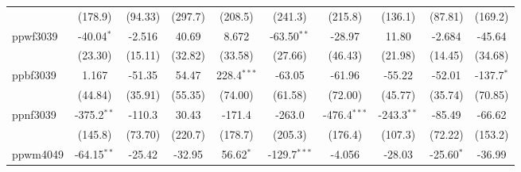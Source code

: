 \begin{table}[htbp]
\begin{tabular}{lccccccccc}
                                     & (178.9)                      & (94.33)                       & (297.7)                     & (208.5)                   & (241.3)                       & (215.8)                      & (136.1)                       & (87.81)                      & (169.2)\\   
      ppwf3039                       & -40.04$^{*}$                 & -2.516                        & 40.69                       & 8.672                     & -63.50$^{**}$                 & -28.97                       & 11.80                         & -2.684                       & -45.64\\   
                                     & (23.30)                      & (15.11)                       & (32.82)                     & (33.58)                   & (27.66)                       & (46.43)                      & (21.98)                       & (14.45)                      & (34.68)\\   
      ppbf3039                       & 1.167                        & -51.35                        & 54.47                       & 228.4$^{***}$             & -63.05                        & -61.96                       & -55.22                        & -52.01                       & -137.7$^{*}$\\   
                                     & (44.84)                      & (35.91)                       & (55.35)                     & (74.00)                   & (61.58)                       & (72.00)                      & (45.77)                       & (35.74)                      & (70.85)\\   
      ppnf3039                       & -375.2$^{**}$                & -110.3                        & 30.43                       & -171.4                    & -263.0                        & -476.4$^{***}$               & -243.3$^{**}$                 & -85.49                       & -66.62\\   
                                     & (145.8)                      & (73.70)                       & (220.7)                     & (178.7)                   & (205.3)                       & (176.4)                      & (107.3)                       & (72.22)                      & (153.2)\\   
      ppwm4049                       & -64.15$^{**}$                & -25.42                        & -32.95                      & 56.62$^{*}$               & -129.7$^{***}$                & -4.056                       & -28.03                        & -25.60$^{*}$                 & -36.99\\   

\end{tabular}
\end{table}
